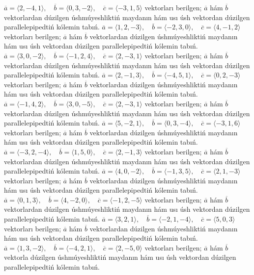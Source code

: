 \(\overline{a} = \langle 2, -4, 1 \rangle, \quad \overline{b} = \langle 0, 3, -2 \rangle, \quad \overline{c} = \langle -3, 1, 5 \rangle\) vektorları berilgen; \(\overline{a}\) hám \(\overline{b}\) vektorlardan dúzilgen úshmúyeshliktiń maydanın hám usı úsh vektordan dúzilgen parallelepipedtiń kólemin tabıń.
\(\overline{a} = \langle 1, 2, -3 \rangle, \quad \overline{b} = \langle -2, 3, 0 \rangle, \quad \overline{c} = \langle 4, -1, 2 \rangle\) vektorları berilgen; \(\overline{a}\) hám \(\overline{b}\) vektorlardan dúzilgen úshmúyeshliktiń maydanın hám usı úsh vektordan dúzilgen parallelepipedtiń kólemin tabıń.
\(\overline{a} = \langle 3, 0, -2 \rangle, \quad \overline{b} = \langle -1, 2, 4 \rangle, \quad \overline{c} = \langle 2, -3, 1 \rangle\) vektorları berilgen; \(\overline{a}\) hám \(\overline{b}\) vektorlardan dúzilgen úshmúyeshliktiń maydanın hám usı úsh vektordan dúzilgen parallelepipedtiń kólemin tabıń.
\(\overline{a} = \langle 2, -1, 3 \rangle, \quad \overline{b} = \langle -4, 5, 1 \rangle, \quad \overline{c} = \langle 0, 2, -3 \rangle\) vektorları berilgen; \(\overline{a}\) hám \(\overline{b}\) vektorlardan dúzilgen úshmúyeshliktiń maydanın hám usı úsh vektordan dúzilgen parallelepipedtiń kólemin tabıń.
\(\overline{a} = \langle -1, 4, 2 \rangle, \quad \overline{b} = \langle 3, 0, -5 \rangle, \quad \overline{c} = \langle 2, -3, 1 \rangle\) vektorları berilgen; \(\overline{a}\) hám \(\overline{b}\) vektorlardan dúzilgen úshmúyeshliktiń maydanın hám usı úsh vektordan dúzilgen parallelepipedtiń kólemin tabıń.
\(\overline{a} = \langle 5, -2, 1 \rangle, \quad \overline{b} = \langle 0, 3, -4 \rangle, \quad \overline{c} = \langle -3, 1, 6 \rangle\) vektorları berilgen; \(\overline{a}\) hám \(\overline{b}\) vektorlardan dúzilgen úshmúyeshliktiń maydanın hám usı úsh vektordan dúzilgen parallelepipedtiń kólemin tabıń.
\(\overline{a} = \langle -3, 2, -4 \rangle, \quad \overline{b} = \langle 1, 5, 0 \rangle, \quad \overline{c} = \langle 2, -1, 3 \rangle\) vektorları berilgen; \(\overline{a}\) hám \(\overline{b}\) vektorlardan dúzilgen úshmúyeshliktiń maydanın hám usı úsh vektordan dúzilgen parallelepipedtiń kólemin tabıń.
\(\overline{a} = \langle 4, 0, -2 \rangle, \quad \overline{b} = \langle -1, 3, 5 \rangle, \quad \overline{c} = \langle 2, 1, -3 \rangle\) vektorları berilgen; \(\overline{a}\) hám \(\overline{b}\) vektorlardan dúzilgen úshmúyeshliktiń maydanın hám usı úsh vektordan dúzilgen parallelepipedtiń kólemin tabıń.
\(\overline{a} = \langle 0, 1, 3 \rangle, \quad \overline{b} = \langle 4, -2, 0 \rangle, \quad \overline{c} = \langle -1, 2, -5 \rangle\) vektorları berilgen; \(\overline{a}\) hám \(\overline{b}\) vektorlardan dúzilgen úshmúyeshliktiń maydanın hám usı úsh vektordan dúzilgen parallelepipedtiń kólemin tabıń.
\(\overline{a} = \langle 3, 2, 1 \rangle, \quad \overline{b} = \langle -2, 1, -4 \rangle, \quad \overline{c} = \langle 5, 0, 3 \rangle\) vektorları berilgen; \(\overline{a}\) hám \(\overline{b}\) vektorlardan dúzilgen úshmúyeshliktiń maydanın hám usı úsh vektordan dúzilgen parallelepipedtiń kólemin tabıń.
\(\overline{a} = \langle 1, 3, -2 \rangle, \quad \overline{b} = \langle -4, 2, 1 \rangle, \quad \overline{c} = \langle 2, -5, 0 \rangle\) vektorları berilgen; \(\overline{a}\) hám \(\overline{b}\) vektorla dúzilgen úshmúyeshliktiń maydanın hám usı úsh vektordan dúzilgen parallelepipedtiń kólemin tabıń.